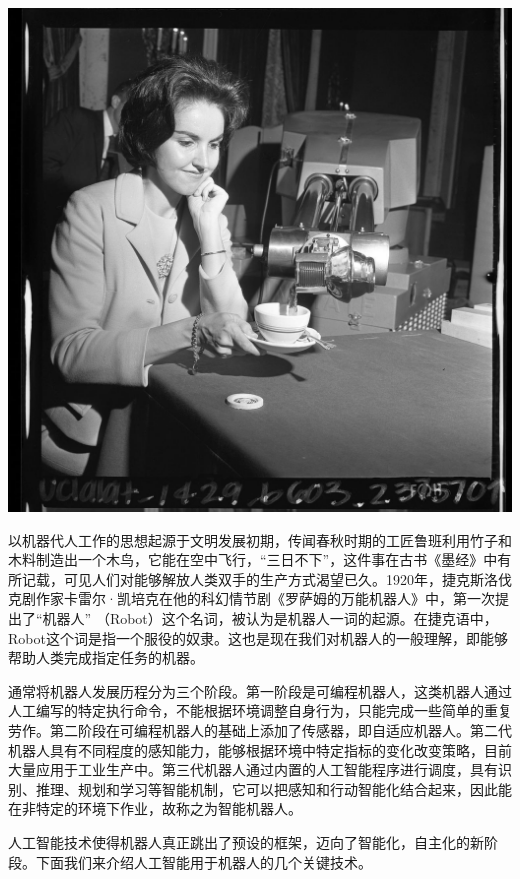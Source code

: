 \begin{marginfigure}
    \includegraphics{images/industry_3.jpg}
\end{marginfigure}

以机器代人工作的思想起源于文明发展初期，传闻春秋时期的工匠鲁班利用竹子和木料制造出一个木鸟，它能在空中飞行，“三日不下”，这件事在古书《墨经》中有所记载，可见人们对能够解放人类双手的生产方式渴望已久。1920年，捷克斯洛伐克剧作家卡雷尔·凯培克在他的科幻情节剧《罗萨姆的万能机器人》中，第一次提出了“机器人” （Robot）这个名词，被认为是机器人一词的起源。在捷克语中，Robot这个词是指一个服役的奴隶。这也是现在我们对机器人的一般理解，即能够帮助人类完成指定任务的机器。

通常将机器人发展历程分为三个阶段。第一阶段是可编程机器人，这类机器人通过人工编写的特定执行命令，不能根据环境调整自身行为，只能完成一些简单的重复劳作。第二阶段在可编程机器人的基础上添加了传感器，即自适应机器人。第二代机器人具有不同程度的感知能力，能够根据环境中特定指标的变化改变策略，目前大量应用于工业生产中。第三代机器人通过内置的人工智能程序进行调度，具有识别、推理、规划和学习等智能机制，它可以把感知和行动智能化结合起来，因此能在非特定的环境下作业，故称之为智能机器人。

人工智能技术使得机器人真正跳出了预设的框架，迈向了智能化，自主化的新阶段。下面我们来介绍人工智能用于机器人的几个关键技术。

